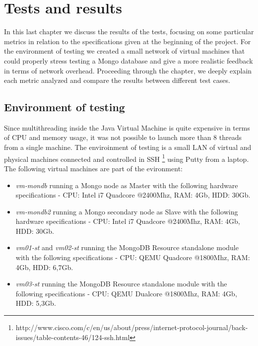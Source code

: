\chapter{Tests and results}
\label{cha:4}
In this last chapter we discuss the results of the tests, focusing on some particular metrics in relation to the specifications given at the beginning of the project. For the environment of testing we created a small network of virtual machines that could properly stress testing a Mongo database and give a more realistic feedback in terms of network overhead.
Proceeding through the chapter, we deeply explain each metric analyzed and compare the results between different test cases.

\section{Environment of testing}
\label{sec:1}
Since multithreading inside the Java Virtual Machine is quite expensive in terms of CPU and memory usage, it was not possible to launch more than 8 threads from a single machine. 
The enviroinment of testing is a small LAN of virtual and physical machines connected and controlled in SSH \footnote{http://www.cisco.com/c/en/us/about/press/internet-protocol-journal/back-issues/table-contents-46/124-ssh.html} using Putty from a laptop.
The following virtual machines are part of the evironment: 
\begin{itemize}
	\item \textit{vm-mondb} running a Mongo node as Master with the following hardware specifications - CPU: Intel i7 Quadcore @2400Mhz, RAM: 4Gb, HDD: 30Gb.
	\item \textit{vm-mondb2} running a Mongo secondary node as Slave with the following hardware specifications - CPU: Intel i7 Quadcore @2400Mhz, RAM: 4Gb, HDD: 30Gb.
	\item \textit{vm01-st} and \textit{vm02-st} running the MongoDB Resource standalone module with the following specifications - CPU: QEMU Quadcore @1800Mhz, RAM: 4Gb, HDD: 6,7Gb.
	\item \textit{vm03-st} running the MongoDB Resource standalone module with the following specifications - CPU: QEMU Dualcore @1800Mhz, RAM: 4Gb, HDD: 5,3Gb.
\end{itemize}
